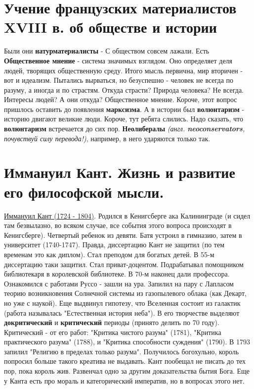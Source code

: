 \section{Учение французских материалистов XVIII в.  об обществе и истории}
Были они \textbf{натурматериалисты} - С обществом совсем лажали. Есть \textbf{Общественное мнение} - система значимых взглядом. Оно определяет деля людей, творящих общественную среду. Итого мысль первична, мир вторичен - вот и идеализм. Пытались вырваться, но безуспешно - человек не всегда по разуму, а иногда и по страстям. Откуда страсти? Природа человека? Не всегда. Интересы людей? А они откуда? Общественное мнение. Короче, этот вопрос пришлось оставить до появления \textbf{марксизма}. А в истории был \textbf{волюнтаризм} - историю двигают великие люди. Короче, тут ребята слились. Надо сказать, что \textbf{волюнтаризм} встречается до сих пор. \textbf{Неолибералы} \textit{(англ. \textbf{neoconservators}, почувствуй силу перевода!)}, например, в него ударяются только так. 

\section{Иммануил Кант.  Жизнь и развитие его философской мысли.}
\underline{Иммануил Кант (1724 - 1804)}. Родился в Кенигсберге ака Калининграде (и сидел там безвылазно, во всяком случае, все события этого вопроса происходят в Кенигсберге). Четвертый ребенок из девяти. Батя устроил в гимназию, затем в университет (1740-1747). Правда, диссертацию Кант не защитил (по тем временам это как диплом). Стал преподом для богатых детей. В 55-м диссертацию таки защитил. Стал приват-доцентом. Подрабатывал помощником библиотекаря в королевской библиотеке. В 70-м наконец дали профессора. Ознакомился с работами Руссо - зашли на ура. Запилил на пару с Лапласом теорию возникновения Солнечной системы из газопылевого облака (как Декарт, но уже с наукой). Еще выдвинул гипотезу, что Вселенная состоит из галактик (работа называлась "Естественная история неба"). В его творчестве выделяют \textbf{докритический} и \textbf{критический} периоды (принято делить по 70 году). Критический - от его работ: "Критика чистого разума" (1781), "Критика практического разума" (1788), и "Критика способности суждения" (1790). В 1793 запилил "Религию в пределах только разума". Получилось богохульно, король попросил больше такого креатива не выдавать. Кант пообещал не писать до тех пор, пока король жив.   Развенчал одно за другим доказательства бытия Бога. Еще у Канта есть про мораль и категорический императив, но в вопросах этого нет. 

